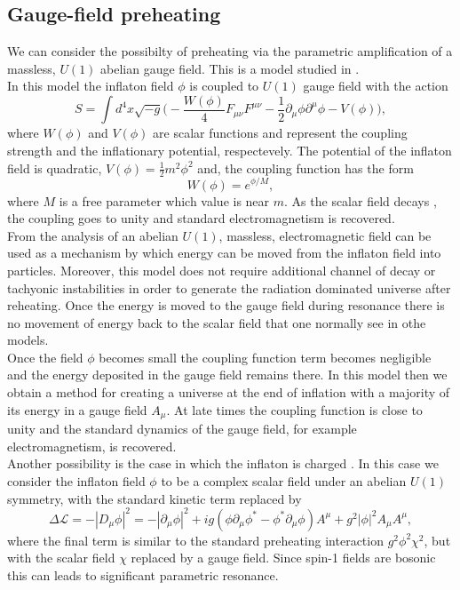 \documentclass[11pt,a4paper,twoside]{book}
\begin{document}
\subsection{Gauge-field preheating}
We can consider the possibilty of preheating via the parametric amplification of a massless, $ U(1) $ abelian gauge field. This is a model studied in \cite{Chap4:GaugeFieldPreheating}. \\
In this model the inflaton field $\phi$ is coupled to $ U(1) $ gauge field with the action
\begin{equation}
\label{Chap4:OtherModels_GaugeFieldPreheatingAction}
S = \int d^{4}x \sqrt{-g}\Bigg(-\frac{W(\phi)}{4}F_{\mu\nu}F^{\mu\nu} - \frac{1}{2}\partial_{\mu}\phi\partial^{\mu}\phi - V(\phi)\Bigg),
\end{equation}
where $ W(\phi) $ and $ V(\phi) $ are scalar functions and represent the coupling strength and the inflationary potential, respectevely. The potential of the inflaton field is quadratic, $ V(\phi)=\frac{1}{2}m^{2}\phi^{2} $ and, the coupling function has the form
\begin{equation}
\label{Chap4:OtherModels_GaugeFieldPotentialCoupling}
W(\phi)=e^{\phi/M},
\end{equation}
where $ M $ is a free parameter which value is near $ m $. As the scalar field decays , the coupling goes to unity and standard electromagnetism is recovered.\\
From  the analysis of \cite{Chap4:GaugeFieldPreheating} an abelian $ U(1) $, massless, electromagnetic field can be used as a mechanism  by which energy can be moved from the inflaton field into particles. Moreover, this model does not require additional channel of decay or tachyonic instabilities in order to generate the radiation dominated universe after reheating. Once the energy is moved to the gauge field during resonance there is no movement of energy back to the scalar field that one normally see in othe models.\\
Once the field $\phi$ becomes small the coupling function term becomes negligible and the energy deposited in the gauge field remains there. In this model then we obtain a method for creating a universe at the end of inflation with a majority of its energy in a gauge field $ A_{\mu} $. At late times the coupling function is close to unity and the standard dynamics of the gauge field, for example electromagnetism, is recovered. \\
Another possibility is the case in which the inflaton is charged \cite{Chap4:ChargedInflatonPreheating}. In this case we consider  the inflaton field $\phi$ to be a complex scalar field under an abelian $ U(1) $ symmetry, with the standard kinetic term replaced by 
\begin{equation}
\label{Chap4:OtherModels_U1KineticTemr}
\Delta \mathcal{L} = - |D_{\mu}\phi|^{2} = -|\partial_{\mu}\phi|^{2} + ig(\phi \partial_{\mu}\phi^{*}-\phi^{*}\partial_{\mu}\phi)A^{\mu} + g^{2}|\phi|^{2}A_{\mu}A^{\mu},
\end{equation}
where the final term is similar to the standard preheating interaction $ g^{2}\phi^{2}\chi^{2} $, but with the scalar field $\chi$ replaced by a gauge field. Since spin-1 fields are bosonic this can leads to significant parametric resonance. 
\end{document}
